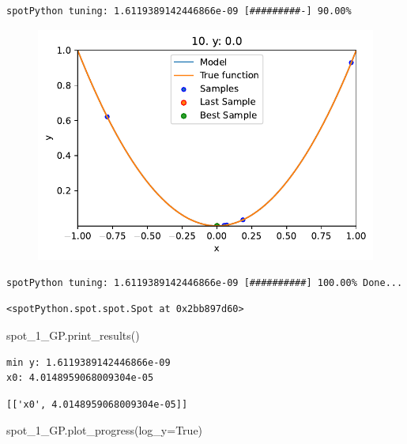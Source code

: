 \documentclass[
  letterpaper,
  DIV=11,
  numbers=noendperiod]{scrreprt}
\newenvironment{Shaded}{\begin{snugshade}}{\end{snugshade}}
\newcommand{\NormalTok}[1]{\textcolor[rgb]{0.00,0.23,0.31}{#1}}
\newcommand{\OperatorTok}[1]{\textcolor[rgb]{0.37,0.37,0.37}{#1}}
\newcommand{\VariableTok}[1]{\textcolor[rgb]{0.07,0.07,0.07}{#1}}
\begin{document}
\begin{verbatim}
spotPython tuning: 1.6119389142446866e-09 [#########-] 90.00% 
\end{verbatim}

\begin{figure}[H]

{\centering \includegraphics{010_num_spot_sklearn_surrogate_files/figure-pdf/cell-25-output-14.pdf}

}

\end{figure}

\begin{verbatim}
spotPython tuning: 1.6119389142446866e-09 [##########] 100.00% Done...
\end{verbatim}

\begin{verbatim}
<spotPython.spot.spot.Spot at 0x2bb897d60>
\end{verbatim}

\begin{Shaded}
\begin{Highlighting}[]
\NormalTok{spot\_1\_GP.print\_results()}
\end{Highlighting}
\end{Shaded}

\begin{verbatim}
min y: 1.6119389142446866e-09
x0: 4.0148959068009304e-05
\end{verbatim}

\begin{verbatim}
[['x0', 4.0148959068009304e-05]]
\end{verbatim}

\begin{Shaded}
\begin{Highlighting}[]
\NormalTok{spot\_1\_GP.plot\_progress(log\_y}\OperatorTok{=}\VariableTok{True}\NormalTok{)}
\end{Highlighting}
\end{Shaded}
\end{document}
